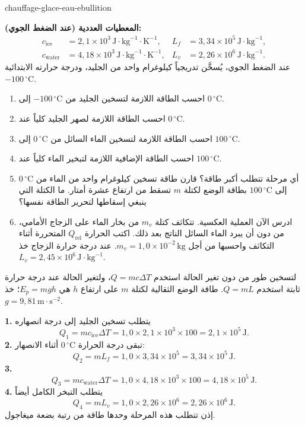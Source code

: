 
\begin{exo}{chauffage-glace-eau-ebullition}

\textbf{المعطيات العددية (عند الضغط الجوي):}
\[
\begin{aligned}
c_{\text{ice}} &= 2{,}1\times10^3\,\text{J}\!\cdot\!\text{kg}^{-1}\!\cdot\!\text{K}^{-1},
& L_f &= 3{,}34\times10^5\,\text{J}\!\cdot\!\text{kg}^{-1},\\
c_{\text{water}} &= 4{,}18\times10^3\,\text{J}\!\cdot\!\text{kg}^{-1}\!\cdot\!\text{K}^{-1},
& L_v &= 2{,}26\times10^6\,\text{J}\!\cdot\!\text{kg}^{-1}.
\end{aligned}
\]
عند الضغط الجوي، يُسخَّن تدريجياً كيلوغرام واحد من الجليد، ودرجة حرارته الابتدائية $-100\,{}^\circ\text{C}$.
\begin{enumerate}
  \item احسب الطاقة اللازمة لتسخين الجليد من $-100\,{}^\circ\text{C}$ إلى $0\,{}^\circ\text{C}$.
  \item احسب الطاقة اللازمة لصهر الجليد كلياً عند $0\,{}^\circ\text{C}$.
  \item احسب الطاقة اللازمة لتسخين الماء السائل من $0\,{}^\circ\text{C}$ إلى $100\,{}^\circ\text{C}$.
  \item احسب الطاقة الإضافية اللازمة لتبخير الماء كلياً عند $100\,{}^\circ\text{C}$.
  \item أي مرحلة تتطلب أكبر طاقة؟ قارن طاقة تسخين كيلوغرام واحد من الماء من $0\,{}^\circ\text{C}$ إلى $100\,{}^\circ\text{C}$ بطاقة الوضع لكتلة $m$ تسقط من ارتفاع عشرة أمتار. ما الكتلة التي ينبغي إسقاطها لتحرير الطاقة نفسها؟
  \item ادرس الآن العملية العكسية. تتكاثف كتلة $m_v$ من بخار الماء على الزجاج الأمامي، من دون أن يبرد الماء السائل الناتج بعد ذلك. اكتب الحرارة $Q_{\text{rel}}$ المتحررة أثناء التكاثف واحسبها من أجل $m_v=1{,}0\times10^{-2}\,\text{kg}$. عند درجة حرارة الزجاج خذ $L_v=2{,}45\times10^6\,\text{J}\!\cdot\!\text{kg}^{-1}$.
\end{enumerate}
\begin{indication}
لتسخين طور من دون تغير الحالة استخدم $Q=mc\Delta T$، ولتغير الحالة عند درجة حرارة ثابتة استخدم $Q=mL$. طاقة الوضع الثقالية لكتلة $m$ على ارتفاع $h$ هي $E_p=mgh$؛ خذ $g=9{,}81\,\text{m}\!\cdot\!\text{s}^{-2}$.
\end{indication}
\begin{solution}
\textbf{1.} يتطلب تسخين الجليد إلى درجة انصهاره
\[
Q_1=mc_{\text{ice}}\Delta T
=1{,}0\times2{,}1\times10^3\times100=2{,}1\times10^5\,\text{J}.
\]
\textbf{2.} تبقى درجة الحرارة $0\,{}^\circ\text{C}$ أثناء الانصهار:
\[
Q_2=mL_f=1{,}0\times3{,}34\times10^5=3{,}34\times10^5\,\text{J}.
\]
\textbf{3.}
\[
Q_3=mc_{\text{water}}\Delta T
=1{,}0\times4{,}18\times10^3\times100=4{,}18\times10^5\,\text{J}.
\]
\textbf{4.} يتطلب التبخر الكامل أيضاً
\[
Q_4=mL_v=1{,}0\times2{,}26\times10^6=2{,}26\times10^6\,\text{J}.
\]
إذن تتطلب هذه المرحلة وحدها طاقة من رتبة بضعة ميغاجول.


\end{solution}
\end{exo}
